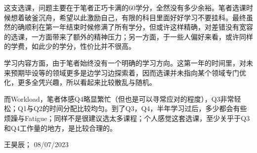 这支选课，问题主要在于笔者正巧卡满的60学分，全然没有多少余裕。笔者选课时候想着破釜沉舟，希望以此激励自己，有限的科目里面好好学习不要挂科。最终虽然的确顺利在第一年结束时候修满了所有学分，但或许这样精确，对差错没有宽容的选课，一方面带来了额外的精神压力；另一方面，于一些人偏好来看，或许同样的学费，如此少的学分，性价比并不很高。

学习内容方面，由于笔者始终没有一个明确的学习方向。这第一年的时间里，对未来预期毕设等的领域更多是边学习边探索着，因而选课并未指向某个领域专门优化，更多全凭兴趣，所以看起来比较散乱与随机。

而Workload，笔者体感Q4略显繁忙（但也是可以寻常应对的程度），Q3非常轻松；Q1与Q2的时间分配比较均匀。到了Q3，Q4，半年学习过后，多少都会有些烦躁与Fatigue；同样不是很建议选太多课程；个人感觉这套选课，至少关乎于Q3和Q4工作量的地方，是比较合理的。
\begin{flushright}
王昊辰； 08/07/2023
\end{flushright}


